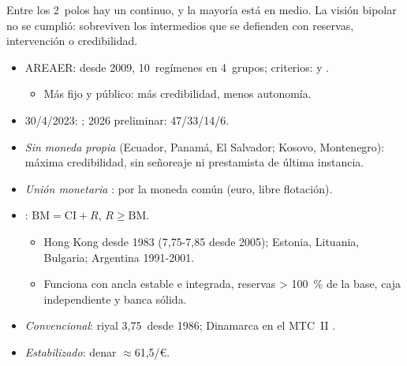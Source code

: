 \documentclass{article}
\begin{document}
\begin{columnas}
\begin{ideaclave}
Entre los 2~polos hay un continuo, y la mayoría está en medio. La visión bipolar no se cumplió: sobreviven los intermedios que se defienden con reservas, intervención o credibilidad.
\end{ideaclave}

\begin{itemize}
\item AREAER: desde 2009, 10~regímenes en 4~grupos; criterios:  y .
  \begin{itemize}
  \item Más fijo y público: más credibilidad, menos autonomía.
  \end{itemize}
\item 30/4/2023: ; 2026 preliminar: 47/33/14/6.
\end{itemize}
\begin{itemize}
\item \emph{Sin moneda propia} (Ecuador, Panamá, El Salvador; Kosovo, Montenegro): máxima credibilidad, sin señoreaje ni prestamista de última instancia.
\item \emph{Unión monetaria} : por la moneda común (euro, libre flotación).
\item {}: $\mathrm{BM}=\mathrm{CI}+R$, $R\geq\mathrm{BM}$.
  \begin{itemize}
  \item Hong Kong desde 1983 (7,75-7,85 desde 2005); Estonia, Lituania, Bulgaria; Argentina 1991-2001.
  \item Funciona con ancla estable e integrada, reservas > 100~\% de la base, caja independiente y banca sólida.
  \end{itemize}
\end{itemize}
\begin{itemize}
\item \emph{Convencional}: riyal 3,75~desde 1986; Dinamarca en el MTC~II .
\item \emph{Estabilizado}: denar $\approx$61,5/€.

\end{itemize}
\end{columnas}
\end{document}
